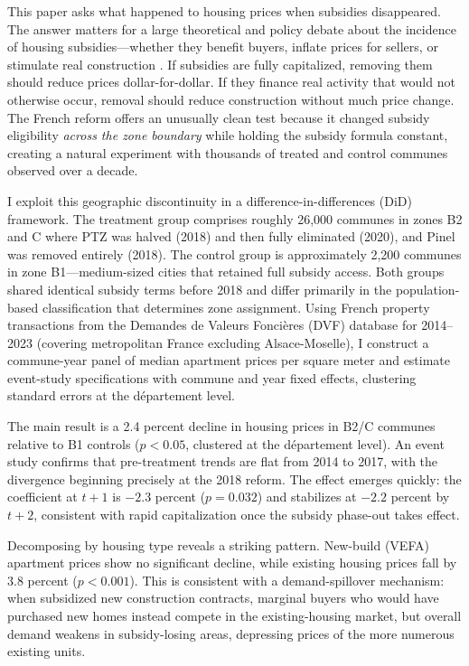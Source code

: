 \documentclass[12pt]{article}
\begin{document}
This paper asks what happened to housing prices when subsidies disappeared. The answer matters for a large theoretical and policy debate about the incidence of housing subsidies---whether they benefit buyers, inflate prices for sellers, or stimulate real construction \citep{poterba1984, glaeser2008, hilber2014}. If subsidies are fully capitalized, removing them should reduce prices dollar-for-dollar. If they finance real activity that would not otherwise occur, removal should reduce construction without much price change. The French reform offers an unusually clean test because it changed subsidy eligibility \textit{across the zone boundary} while holding the subsidy formula constant, creating a natural experiment with thousands of treated and control communes observed over a decade.

I exploit this geographic discontinuity in a difference-in-differences (DiD) framework. The treatment group comprises roughly 26,000 communes in zones B2 and C where PTZ was halved (2018) and then fully eliminated (2020), and Pinel was removed entirely (2018). The control group is approximately 2,200 communes in zone B1---medium-sized cities that retained full subsidy access. Both groups shared identical subsidy terms before 2018 and differ primarily in the population-based classification that determines zone assignment. Using French property transactions from the Demandes de Valeurs Fonci\`{e}res (DVF) database for 2014--2023 (covering metropolitan France excluding Alsace-Moselle), I construct a commune-year panel of median apartment prices per square meter and estimate event-study specifications with commune and year fixed effects, clustering standard errors at the d\'{e}partement level.

The main result is a 2.4 percent decline in housing prices in B2/C communes relative to B1 controls ($p < 0.05$, clustered at the d\'{e}partement level). An event study confirms that pre-treatment trends are flat from 2014 to 2017, with the divergence beginning precisely at the 2018 reform. The effect emerges quickly: the coefficient at $t+1$ is $-2.3$ percent ($p = 0.032$) and stabilizes at $-2.2$ percent by $t+2$, consistent with rapid capitalization once the subsidy phase-out takes effect.

Decomposing by housing type reveals a striking pattern. New-build (VEFA) apartment prices show no significant decline, while existing housing prices fall by 3.8 percent ($p<0.001$). This is consistent with a demand-spillover mechanism: when subsidized new construction contracts, marginal buyers who would have purchased new homes instead compete in the existing-housing market, but overall demand weakens in subsidy-losing areas, depressing prices of the more numerous existing units.
\end{document}

